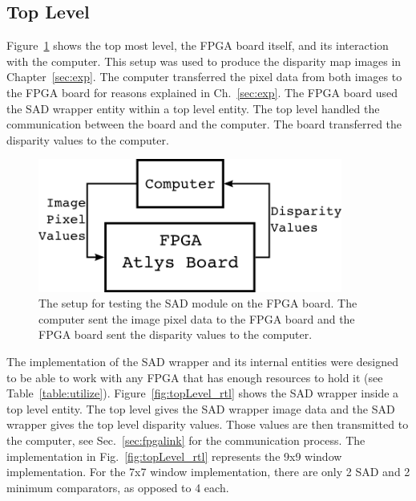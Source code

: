 \subsection{Top Level}

Figure~\ref{fig:compFPGAcomp} shows the top most level, the FPGA board itself, and its interaction with the computer. This setup was used to produce the disparity map images in Chapter~\ref{sec:exp}. The computer transferred the pixel data from both images to the FPGA board for reasons explained in Ch.~\ref{sec:exp}. The FPGA board used the SAD wrapper entity within a top level entity. The top level handled the communication between the board and the computer. The board transferred the disparity values to the computer.

\begin{figure}[h]
	\begin{center}
		\includegraphics[width=100mm]{figures/compFPGAcomp.png}
		\captionfonts
		\caption{The setup for testing the SAD module on the FPGA board. The computer sent the image pixel data to the FPGA board and the FPGA board sent the disparity values to the computer.}
		\label{fig:compFPGAcomp}
	\end{center}
\end{figure}

The implementation of the SAD wrapper and its internal entities were designed to be able to work with any FPGA that has enough resources to hold it (see Table~\ref{table:utilize}). Figure~\ref{fig:topLevel_rtl} shows the SAD wrapper inside a top level entity. The top level gives the SAD wrapper image data and the SAD wrapper gives the top level disparity values. Those values are then transmitted to the computer, see Sec.~\ref{sec:fpgalink} for the communication process. The implementation in Fig.~\ref{fig:topLevel_rtl} represents the 9x9 window implementation. For the 7x7 window implementation, there are only 2 SAD and 2 minimum comparators, as opposed to 4 each.


